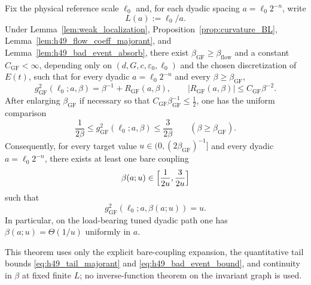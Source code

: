\begin{theorem}\label{thm:h49_bare_flow_window}
Fix the physical reference scale $\ell_0$ and, for each dyadic spacing $a=\ell_0 2^{-n}$, write
\[
L(a):=\ell_0/a.
\]
Under Lemma~\ref{lem:weak_localization}, Proposition~\ref{prop:curvature_BL}, Lemma~\ref{lem:h49_flow_coeff_majorant}, and Lemma~\ref{lem:h49_bad_event_absorb}, there exist $\beta_{\mathrm{GF}}\ge\beta_{\mathrm{flow}}$ and a constant $C_{\mathrm{GF}}<\infty$, depending only on $(d,G,c,\varepsilon_0,\ell_0)$ and the chosen discretization of $E(t)$, such that for every dyadic $a=\ell_0 2^{-n}$ and every $\beta\ge\beta_{\mathrm{GF}}$,
\begin{equation}\label{eq:h49_gf_beta_expansion}
 g_{\mathrm{GF}}^2(\ell_0;a,\beta)
 =
 \beta^{-1}+R_{\mathrm{GF}}(a,\beta),
 \qquad
 |R_{\mathrm{GF}}(a,\beta)|\le C_{\mathrm{GF}}\beta^{-2}.
\end{equation}
After enlarging $\beta_{\mathrm{GF}}$ if necessary so that $C_{\mathrm{GF}}\beta_{\mathrm{GF}}^{-1}\le\tfrac12$, one has the uniform comparison
\begin{equation}\label{eq:h49_gf_beta_comparison}
 \frac{1}{2\beta}
 \le
 g_{\mathrm{GF}}^2(\ell_0;a,\beta)
 \le
 \frac{3}{2\beta}
 \qquad (\beta\ge\beta_{\mathrm{GF}}).
\end{equation}
Consequently, for every target value $u\in\bigl(0,(2\beta_{\mathrm{GF}})^{-1}\bigr]$ and every dyadic $a=\ell_0 2^{-n}$, there exists at least one bare coupling
\begin{equation}\label{eq:h49_beta_selection_interval}
 \beta(a;u)\in\Bigl[\frac{1}{2u},\frac{3}{2u}\Bigr]
\end{equation}
such that
\begin{equation}\label{eq:h49_beta_selection_exact}
 g_{\mathrm{GF}}^2(\ell_0;a,\beta(a;u))=u.
\end{equation}
In particular, on the load-bearing tuned dyadic path one has $\beta(a;u)=\Theta(1/u)$ uniformly in $a$.

This theorem uses only the explicit bare-coupling expansion, the quantitative tail bounds \eqref{eq:h49_tail_majorant} and \eqref{eq:h49_bad_event_bound}, and continuity in $\beta$ at fixed finite $L$; no inverse-function theorem on the invariant graph is used.
\end{theorem}

